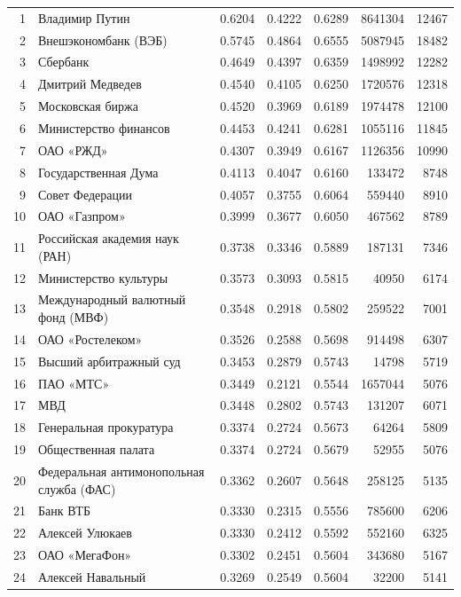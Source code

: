 {\begin{longtable}{r >{\raggedright\arraybackslash}p{4.2cm} S[table-format=1.4] S[table-format=1.4] S[table-format=1.4] r r}
1 & Владимир Путин & 0.6204 & 0.4222 & 0.6289 & 8641304 & 12467 \\
2 & Внешэкономбанк (ВЭБ) & 0.5745 & 0.4864 & 0.6555 & 5087945 & 18482 \\
3 & Сбербанк & 0.4649 & 0.4397 & 0.6359 & 1498992 & 12282 \\
4 & Дмитрий Медведев & 0.4540 & 0.4105 & 0.6250 & 1720576 & 12318 \\
5 & Московская биржа & 0.4520 & 0.3969 & 0.6189 & 1974478 & 12100 \\
6 & Министерство финансов & 0.4453 & 0.4241 & 0.6281 & 1055116 & 11845 \\
7 & ОАО «РЖД» & 0.4307 & 0.3949 & 0.6167 & 1126356 & 10990 \\
8 & Государственная Дума & 0.4113 & 0.4047 & 0.6160 & 133472 & 8748 \\
9 & Совет Федерации & 0.4057 & 0.3755 & 0.6064 & 559440 & 8910 \\
10 & ОАО «Газпром» & 0.3999 & 0.3677 & 0.6050 & 467562 & 8789 \\
11 & Российская академия наук (РАН) & 0.3738 & 0.3346 & 0.5889 & 187131 & 7346 \\
12 & Министерство культуры & 0.3573 & 0.3093 & 0.5815 & 40950 & 6174 \\
13 & Международный валютный фонд (МВФ) & 0.3548 & 0.2918 & 0.5802 & 259522 & 7001 \\
14 & ОАО «Ростелеком» & 0.3526 & 0.2588 & 0.5698 & 914498 & 6307 \\
15 & Высший арбитражный суд & 0.3453 & 0.2879 & 0.5743 & 14798 & 5719 \\
16 & ПАО «МТС» & 0.3449 & 0.2121 & 0.5544 & 1657044 & 5076 \\
17 & МВД & 0.3448 & 0.2802 & 0.5743 & 131207 & 6071 \\
18 & Генеральная прокуратура & 0.3374 & 0.2724 & 0.5673 & 64264 & 5809 \\
19 & Общественная палата & 0.3374 & 0.2724 & 0.5679 & 52955 & 5076 \\
20 & Федеральная антимонопольная служба (ФАС) & 0.3362 & 0.2607 & 0.5648 & 258125 & 5135 \\
21 & Банк ВТБ & 0.3330 & 0.2315 & 0.5556 & 785600 & 6206 \\
22 & Алексей Улюкаев & 0.3330 & 0.2412 & 0.5592 & 552160 & 6325 \\
23 & ОАО «МегаФон» & 0.3302 & 0.2451 & 0.5604 & 343680 & 5167 \\
24 & Алексей Навальный & 0.3269 & 0.2549 & 0.5604 & 32200 & 5141 \\

\end{longtable}}
